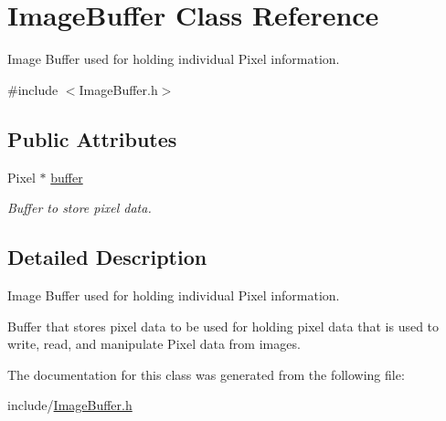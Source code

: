 \hypertarget{structImageBuffer}{}\section{Image\+Buffer Class Reference}
\label{structImageBuffer}


Image Buffer used for holding individual Pixel information.  




{\ttfamily \#include $<$Image\+Buffer.\+h$>$}

\subsection*{Public Attributes}
\begin{DoxyCompactItemize}
\item 
\mbox{\label{structImageBuffer_acfaa0fdac0150fc07cbcbcc857e8c18f}} 
Pixel $\ast$ \hyperlink{structImageBuffer_acfaa0fdac0150fc07cbcbcc857e8c18f}{buffer}
\begin{DoxyCompactList}\small\item\em Buffer to store pixel data. \end{DoxyCompactList}\end{DoxyCompactItemize}


\subsection{Detailed Description}
Image Buffer used for holding individual Pixel information. 

Buffer that stores pixel data to be used for holding pixel data that is used to write, read, and manipulate Pixel data from images. 

The documentation for this class was generated from the following file\+:\begin{DoxyCompactItemize}
\item 
include/\hyperlink{ImageBuffer_8h}{Image\+Buffer.\+h}\end{DoxyCompactItemize}
